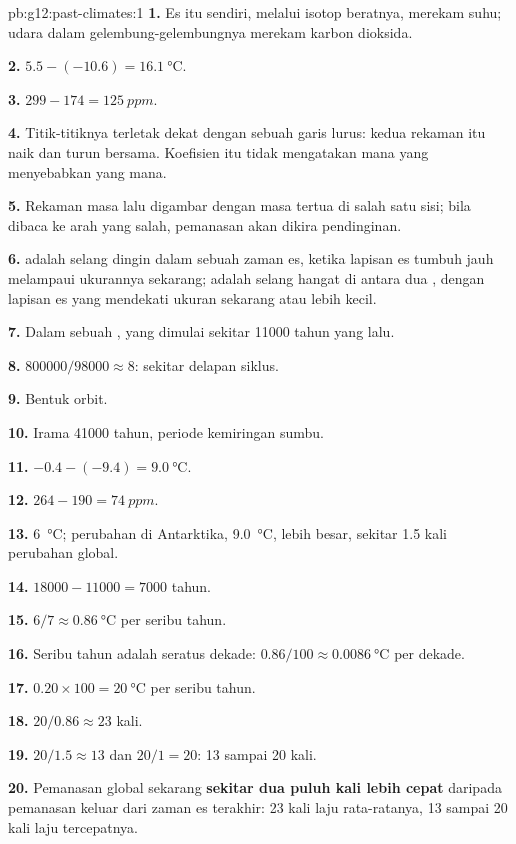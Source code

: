 \begin{solution}{pb:g12:past-climates:1}
\textbf{1.} Es itu sendiri, melalui isotop beratnya, merekam suhu; udara dalam
gelembung-gelembungnya merekam karbon dioksida.

\textbf{2.} $5.5 - (-10.6) = \qty{16.1}{\degreeCelsius}$.

\textbf{3.} $299 - 174 = \qty{125}{ppm}$.

\textbf{4.} Titik-titiknya terletak dekat dengan sebuah garis lurus: kedua
rekaman itu naik dan turun bersama. Koefisien itu tidak mengatakan mana yang
menyebabkan yang mana.

\textbf{5.} Rekaman masa lalu digambar dengan masa tertua di salah satu sisi;
bila dibaca ke arah yang salah, pemanasan akan dikira pendinginan.

\textbf{6.}  adalah selang dingin dalam sebuah zaman es, ketika
lapisan es tumbuh jauh melampaui ukurannya sekarang;  adalah selang
hangat di antara dua , dengan lapisan es yang mendekati ukuran
sekarang atau lebih kecil.

\textbf{7.} Dalam sebuah , yang dimulai sekitar \num{11000} tahun
yang lalu.

\textbf{8.} $\num{800000}/\num{98000} \approx 8$: sekitar delapan siklus.

\textbf{9.} Bentuk orbit.

\textbf{10.} Irama \num{41000} tahun, periode kemiringan sumbu.

\textbf{11.} $-0.4 - (-9.4) = \qty{9.0}{\degreeCelsius}$.

\textbf{12.} $264 - 190 = \qty{74}{ppm}$.

\textbf{13.} \qty{6}{\degreeCelsius}; perubahan di Antarktika, \qty{9.0}{\degreeCelsius},
lebih besar, sekitar 1.5 kali perubahan global.

\textbf{14.} $\num{18000} - \num{11000} = \num{7000}$ tahun.

\textbf{15.} $6/7 \approx \qty{0.86}{\degreeCelsius}$ per seribu tahun.

\textbf{16.} Seribu tahun adalah seratus dekade: $0.86/100 \approx
\qty{0.0086}{\degreeCelsius}$ per dekade.

\textbf{17.} $0.20 \times 100 = \qty{20}{\degreeCelsius}$ per seribu tahun.

\textbf{18.} $20/0.86 \approx 23$ kali.

\textbf{19.} $20/1.5 \approx 13$ dan $20/1 = 20$: 13 sampai 20 kali.

\textbf{20.} Pemanasan global sekarang \textbf{sekitar dua puluh kali lebih
cepat} daripada pemanasan keluar dari zaman es terakhir: 23 kali laju
rata-ratanya, 13 sampai 20 kali laju tercepatnya.
\end{solution}
